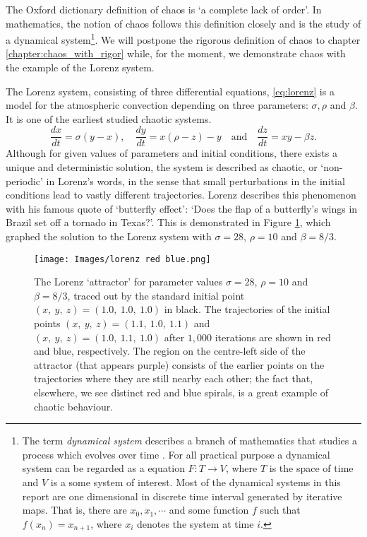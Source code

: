 The Oxford dictionary definition of chaos is `a complete lack of order'. 
In mathematics, the notion of chaos follows this definition closely and is the study of a dynamical system\footnote{
	The term \emph{dynamical system} describes a branch of mathematics that studies a process which evolves over time \cite{Devaney_green_book_chaos_definition}. 
	For all practical purpose a dynamical system can be regarded as a equation $F: T \rightarrow V$, where $T$ is the space of time and $V$ is a some system of interest. 
	Most of the dynamical systems in this report are one dimensional in discrete time interval generated by iterative maps. 
That is, there are $x_0, x_1, \cdots$ and some function $f$ such that $f(x_n) = x_{n+1}$, where $x_{i}$ denotes the system at time $i$.}.
We will postpone the rigorous definition of chaos to chapter \ref{chapter:chaos_with_rigor} while, for the moment, we demonstrate chaos with the example of the Lorenz system.


\begin{exmp}
	The Lorenz system\cite{lorenz1963deterministic}, consisting of three differential equations, \eqref{eq:lorenz} is a model for the atmospheric convection depending on three parameters: $\sigma, \rho$ and $\beta$.
	It is one of the earliest studied chaotic systems.
	\begin{equation}\label{eq:lorenz}
    \frac{dx}{dt} = \sigma (y-x), \quad \frac{dy}{dt} = x(\rho -z)-y \quad\text{and} \quad \frac{dz}{dt} = xy-\beta z.
	\end{equation}
	Although for given values of parameters and initial conditions, there exists a unique and deterministic solution, the system is described as chaotic, or `non-periodic' in Lorenz's words, in the sense that small perturbations in the initial conditions lead to vastly different trajectories.
	Lorenz describes this phenomenon with his famous quote of `butterfly effect': `Does the flap of a butterfly's wings in Brazil set off a tornado in Texas?'.
	This is demonstrated in Figure \ref{fig:lorenzrb}, which graphed the solution to the Lorenz system with $\sigma=28$, $\rho=10$ and $\beta=8/3$.

\begin{figure}
    \centering
    \texttt{[image: Images/lorenz red blue.png]}
    \caption{The Lorenz `attractor' for parameter values $\sigma=28$, $\rho=10$ and $\beta=8/3$, traced out by the standard initial point $(x,\ y,\ z)=(1.0,\ 1.0,\ 1.0)$ in black. The trajectories of the initial points $(x,\ y,\ z)=(1.1,\ 1.0,\ 1.1)$ and $(x,\ y,\ z)=(1.0,\ 1.1,\ 1.0)$ after $1,000$ iterations are shown in red and blue, respectively. The region on the centre-left side of the attractor (that appears purple) consists of the earlier points on the trajectories where they are still nearby each other; the fact that, elsewhere, we see distinct red and blue spirals, is a great example of chaotic behaviour.}
    \label{fig:lorenzrb}
\end{figure}
\end{exmp}

